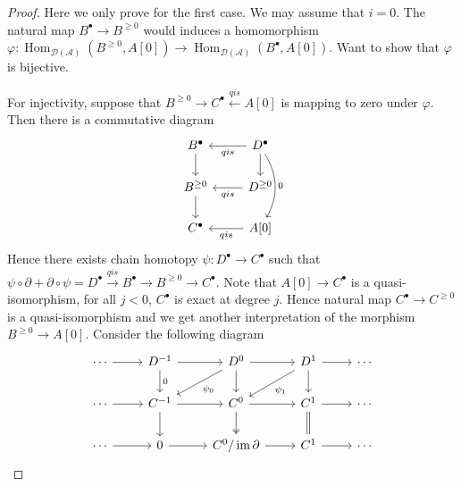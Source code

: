 \documentclass{ctexart}
\renewcommand{\hom}{\operatorname{Hom}}
\newcommand{\im}{\operatorname{im}}
\begin{document}
\begin{proof}
    Here we only prove for the first case.
    We may assume that $i = 0$.
    The natural map $B^{\bullet} \rightarrow B^{\ge 0}$ would induces a homomorphism $\varphi: \hom_{\mathcal{D}(\mathscr{A})}(B^{\ge 0}, A[0]) \rightarrow \hom_{\mathcal{D}(\mathscr{A})}(B^{\bullet}, A[0])$.
    Want to show that $\varphi$ is bijective.
    \par
    For injectivity, suppose that $B^{\ge 0} \rightarrow C^{\bullet} \overset{qis}{\leftarrow} A[0]$ is mapping to zero under $\varphi$.
    Then there is a commutative diagram
    \begin{equation}
        \begin{tikzcd}
            B^{\bullet} \arrow[d] &
            D^{\bullet} \arrow[dd, "0", bend left] \arrow[d] \arrow[l, "qis"] \\
            B^{\ge 0} \arrow[d] &
            D^{\ge 0} \arrow[l, "qis"] \\
            C^{\bullet} &
            A[0] \arrow[l, "qis"]
        \end{tikzcd}
    \end{equation}
    Hence there exists chain homotopy $\psi: D^{\bullet} \rightarrow C^{\bullet}$ such that $\psi \circ \partial + \partial \circ \psi = D^{\bullet} \overset{qis}{\rightarrow} B^{\bullet} \rightarrow B^{\ge 0} \rightarrow C^{\bullet}$.
    Note that $A[0] \rightarrow C^{\bullet}$ is a quasi-isomorphism,
    for all $j < 0$, $C^{\bullet}$ is exact at degree $j$.
    Hence natural map $C^{\bullet} \rightarrow C^{\ge 0}$ is a quasi-isomorphism and we get another interpretation of the morphism $B^{\ge 0} \rightarrow A[0]$.
    Consider the following diagram
    \begin{equation}
        \begin{tikzcd}
            \cdots \arrow[r] & 
            D^{-1} \arrow[r] \arrow[d, "0"] &
            D^{0} \arrow[r] \arrow[d] \arrow[dl, "\psi_{0}"] &
            D^{1} \arrow[r] \arrow[d] \arrow[dl, "\psi_{1}"] &
            \cdots \\
            \cdots \arrow[r] &
            C^{-1} \arrow[r] \arrow[d] &
            C^{0} \arrow[r] \arrow[d, twoheadrightarrow] &
            C^{1} \arrow[r] \arrow[d, equal] &
            \cdots \\
            \cdots \arrow[r] &
            0 \arrow[r] &
            C^{0}/\im \partial \arrow[r] &
            C^{1} \arrow[r] &
            \cdots
        \end{tikzcd}
    \end{equation}

\end{proof}
\end{document}
